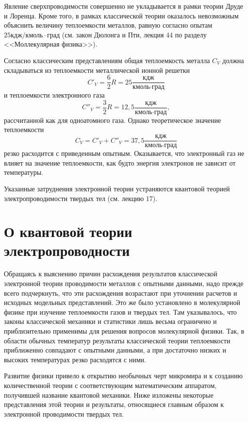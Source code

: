 \documentclass[a4paper,10pt]{book}
\begin{document}
Явление сверхпроводимости совершенно не укладывается в рамки теории Друде и Лоренца. Кроме того, в рамках классической теории оказалось 
невозможным объяснить величину теплоемкости металлов, равную согласно опытам $25 \text{кдж}/\text{кмоль}\cdot\text{град}$ (см. закон 
Дюлонга и Пти, лекция 44 по разделу <<Моллекулярная физика>>).

Согласно классическим представлениям общая теплоемкость металла $C_V$ должна складываться из теплоемкости металлической ионной решетки
\begin{equation*}
 C'_V = \frac{6}{2}R = 25\frac{\text{кдж}}{\text{кмоль}\cdot\text{град}}
\end{equation*}
и теплоемкости электронного газа
\begin{equation*}
 C''_V = \frac{3}{2}R = 12,5\frac{\text{кдж}}{\text{кмоль}\cdot\text{град}},
\end{equation*}
рассчитанной как для одноатомного газа. Однако теоретическое значение теплоемкости
\begin{equation*}
 C_V = C'_V + C''_V = 37,5 \frac{\text{кдж}}{\text{кмоль}\cdot\text{град}}
\end{equation*}
резко расходится с приведенным опытным. Оказывается, что электронный газ не влияет на значение теплоемкости, как будто энергия электронов
не зависит от температуры.

Указанные затруднения электронной теории устраняются квантовой теорией электропроводимости твердых тел (см. лекцию 17).
\chapter{О квантовой теории электропроводности}
Обращаясь к выяснению причин расхождения результатов классической электронной теории проводимости металлов с опытными данными, надо прежде всего подчеркнуть, что эти расхождения возрастают при уточнении расчетов и исходных модельных представлений. Это же было установлено в молекулярной физике при изучение теплоемкости газов и твердых тел. Там указывалось, что законы классической механики и статистики лишь весьма ограничено и приблизительно применимы для решения вопросов молекулярной физики. Так, в области обычных температур результаты классической теории теплоемкости приближенно совпадают с опытными данными, а при достаточно низких и высоких температурах резко расходятся с ними.

Развитие физики привело к открытию необычных черт микромира и к созданию количественной теории с соответствующим математическим аппаратом, получившей название квантовой механики. Ниже изложены некоторые представления этой теории и результаты, относящиеся главным образом к электронной проводимости твердых тел.
\end{document}
